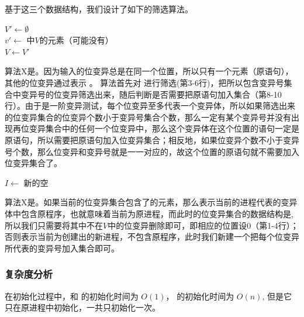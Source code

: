\documentclass[nofonts]{ctexrep}
\begin{document}
基于这三个数据结构，我们设计了如下的筛选算法。

\begin{algorithm}
  $V' \leftarrow \emptyset$\\
  $v' \leftarrow$ \DefaultSet 中$V$的元素（可能没有）\\
  $V \leftarrow V'$  
\caption{\filterv}
\label{alg:filterv}
\end{algorithm}

算法X是\filterv 。因为输入的位变异总是在同一个位置，所以\DefaultSet 只有一个元素（原语句），其他的位变异通过\ListSet 表示 。
算法首先对 \ListSet 进行筛选(第3-6行)，把所以包含变异号集合中变异号的位变异筛选出来，随后判断是否需要把原语句加入集合（第8-10行）。由于是一阶变异测试，每个位变异至多代表一个变异体，所以如果筛选出来的位变异集合的位变异个数小于变异号集合个数，那么一定有某个变异号并没有出现再位变异集合中的任何一个位变异中，那么这个变异体在这个位置的语句一定是原语句，所以需要把原语句加入位变异集合；相反地，如果位变异个数不小于变异号个数，那么位变异和变异号就是一一对应的，故这个位置的原语句就不需要加入位变异集合了。

\begin{algorithm}
  {
    $I \leftarrow$ 新的空 \ListSet\\
  }
\caption{\filterm}
\label{alg:filterm}
\end{algorithm}

算法X是\filterm 。如果当前的位变异集合包含了\DefaultSet 的元素，那么表示当前的进程代表的变异体中包含原程序，也就意味着当前为原进程，而此时的位变异集合的数据结构是\VectorSet ,所以我们只需要将其中不在$V$中的位变异删除即可，即相应的位置设0（第1-4行）；否则表示当前为创建出的新进程，不包含原程序，此时我们新建一个\ListSet 把每个位变异所代表的变异号加入集合即可。

\subsubsection{复杂度分析}
在初始化过程中，\ListSet 和 \DefaultSet 的初始化时间为 $O(1)$， \VectorSet 的初始化时间为 $O(n)$, 但是它只在原进程中初始化，一共只初始化一次。
\end{document}
